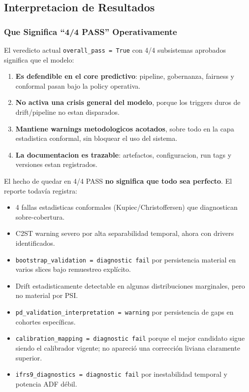 \documentclass[
  spanish,
  11pt,
  letterpaper,
]{scrbook}
\providecommand{\tightlist}{%
  \setlength{\itemsep}{0pt}\setlength{\parskip}{0pt}}
\theoremstyle{plain}
\theoremstyle{remark}
\begin{document}
\subsection{Interpretacion de Resultados}\label{sec-mrm-interpretation}

\subsubsection{Que Significa ``4/4 PASS''
Operativamente}\label{que-significa-44-pass-operativamente}

El veredicto actual \texttt{overall\_pass\ =\ True} con 4/4 subsistemas
aprobados significa que el modelo:

\begin{enumerate}
\def\labelenumi{\arabic{enumi}.}
\tightlist
\item
  \textbf{Es defendible en el core predictivo}: pipeline, gobernanza,
  fairness y conformal pasan bajo la policy operativa.
\item
  \textbf{No activa una crisis general del modelo}, porque los triggers
  duros de drift/pipeline no estan disparados.
\item
  \textbf{Mantiene warnings metodologicos acotados}, sobre todo en la
  capa estadistica conformal, sin bloquear el uso del sistema.
\item
  \textbf{La documentacion es trazable}: artefactos, configuracion, run
  tags y versiones estan registrados.
\end{enumerate}

El hecho de quedar en 4/4 PASS \textbf{no significa que todo sea
perfecto}. El reporte todavía registra:

\begin{itemize}
\tightlist
\item
  4 fallas estadisticas conformales (Kupiec/Christoffersen) que
  diagnostican sobre-cobertura.
\item
  C2ST warning severo por alta separabilidad temporal, ahora con drivers
  identificados.
\item
  \texttt{bootstrap\_validation\ =\ diagnostic\ fail} por persistencia
  material en varios slices bajo remuestreo explícito.
\item
  Drift estadisticamente detectable en algunas distribuciones
  marginales, pero no material por PSI.
\item
  \texttt{pd\_validation\_interpretation\ =\ warning} por persistencia
  de gaps en cohortes específicas.
\item
  \texttt{calibration\_mapping\ =\ diagnostic\ fail} porque el mejor
  candidato sigue siendo el calibrador vigente; no apareció una
  corrección liviana claramente superior.
\item
  \texttt{ifrs9\_diagnostics\ =\ diagnostic\ fail} por inestabilidad
  temporal y potencia ADF débil.
\end{itemize}
\end{document}
